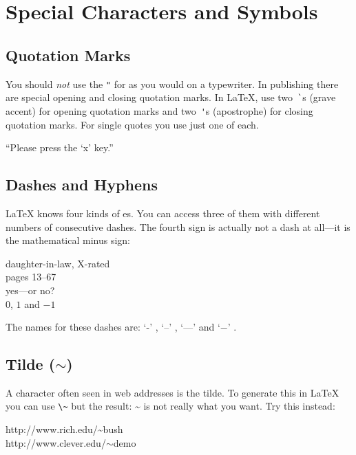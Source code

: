 \section{Special Characters and Symbols}
 
\subsection{Quotation Marks}

You should \emph{not} use the \verb|"| for 
 as you would on a typewriter.  In publishing
there are special opening and closing quotation marks.  In \LaTeX{},
use two~\verb|`|s (grave accent) for opening quotation marks and
two~\verb|'|s (apostrophe) for closing quotation marks. For single
quotes you use just one of each.
\begin{example}
``Please press the `x' key.''
\end{example}
 
\subsection{Dashes and Hyphens}

\LaTeX{} knows four kinds of es. You can access three of
them with different numbers of consecutive dashes. The fourth sign
is actually not a dash at all---it is the mathematical minus sign: \index{-}
\index{--} \index{---}  

\begin{example}
daughter-in-law, X-rated\\
pages 13--67\\
yes---or no? \\
$0$, $1$ and $-1$
\end{example}
The names for these dashes are: 
`-' , `--' , `---'  and
`$-$' .

\subsection{Tilde (\texorpdfstring{$\sim$}{})}
A character often seen in web addresses is the tilde. To generate
this in \LaTeX{} you can use \verb|\~| but the result: \~{} is not really
what you want. Try this instead:

\begin{example}
http://www.rich.edu/\~{}bush \\
http://www.clever.edu/$\sim$demo
\end{example}  
 

